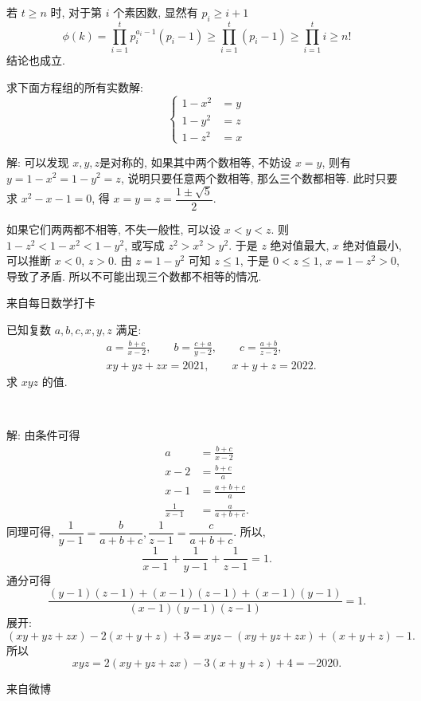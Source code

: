 若 $t \ge n$ 时, 对于第 $i$ 个素因数, 显然有 $p_i \ge i + 1$
\[\phi(k) = \prod_{i=1}^t{p_i^{a_i-1}(p_i-1)} \ge \prod_{i=1}^t(p_i-1) \ge \prod_{i=1}^t i \ge n!\]
结论也成立.

\newpage

求下面方程组的所有实数解:
\[
\begin{cases}
1 - x^2 & = y \\
1 - y^2 & = z \\
1 - z^2 & = x 
\end{cases}
\]

解: 可以发现 $x,y,z $是对称的, 如果其中两个数相等, 不妨设 $ x=y $, 则有 $ y = 1 - x^2 = 1 - y^2 = z $, 说明只要任意两个数相等, 那么三个数都相等. 此时只要求 $ x^2 - x - 1 = 0 $, 得 $ x = y = z = \dfrac{1\pm \sqrt{5}}{2} $.

如果它们两两都不相等, 不失一般性, 可以设 $ x < y < z $. 则 $ 1-z^2 < 1-x^2 < 1-y^2 $, 或写成 $ z^2 > x^2 > y^2 $. 于是 $z$ 绝对值最大, $x$ 绝对值最小, 可以推断 $ x < 0 $, $ z > 0 $. 由 $ z = 1 - y^2 $ 可知 $ z \le 1 $, 于是 $ 0 < z \le 1 $, $ x = 1 - z^2 > 0 $, 导致了矛盾. 所以不可能出现三个数都不相等的情况.

\newpage
\noindent 来自每日数学打卡

已知复数 $a,b,c,x,y,z$ 满足:
\begin{align*}
& a = \frac{b+c}{x-2}, \qquad b = \frac{c+a}{y-2},\qquad c = \frac{a+b}{z-2},\\
& xy+yz+zx = 2021,\qquad x+y+z=2022.
\end{align*}
求 $xyz$ 的值.

~

解: 由条件可得
\begin{align*}
a &= \frac{b+c}{x-2}\\
x-2 &= \frac{b+c}{a}\\
x-1 &= \frac{a+b+c}{a}\\
\frac{1}{x-1} &= \frac{a}{a+b+c}.
\end{align*}
同理可得, $\dfrac{1}{y-1} = \dfrac{b}{a+b+c}, \dfrac{1}{z-1} = \dfrac{c}{a+b+c}$.
所以, 
\[\frac{1}{x-1} + \frac{1}{y-1}+\frac{1}{z-1} = 1.\]
通分可得
\[\frac{(y-1)(z-1)+(x-1)(z-1)+(x-1)(y-1)}{(x-1)(y-1)(z-1)} = 1.\]
展开:
\[ (xy + yz + zx) - 2(x+y+z) + 3 = xyz - (xy+yz+zx) + (x+y+z) - 1.\]
所以
\[xyz = 2(xy+yz+zx) - 3(x+y+z) + 4 = -2020.\]

\newpage
\noindent 来自微博

